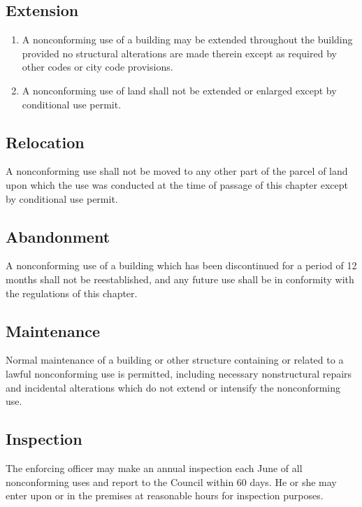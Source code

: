 \subsection{Extension}
\begin{enumerate}[{\indent}1)]
    \item A nonconforming use of a building may be extended throughout the building provided no structural alterations are made therein except as required by other codes or city code provisions.
    \item A nonconforming use of land shall not be extended or enlarged except by conditional use permit.
\end{enumerate}
\subsection{Relocation}
A nonconforming use shall not be moved to any other part of the parcel of land upon which the use was conducted at the time of passage of this chapter except by conditional use permit.
\subsection{Abandonment}
A nonconforming use of a building which has been discontinued for a period of 12 months shall not be reestablished, and any future use shall be in conformity with the regulations of this chapter.
\subsection{Maintenance}
Normal maintenance of a building or other structure containing or related to a lawful nonconforming use is permitted, including necessary nonstructural repairs and incidental alterations which do not extend or intensify the nonconforming use.
\subsection{Inspection}
The enforcing officer may make an annual inspection each June of all nonconforming uses and report to the Council within 60 days.  He or she may enter upon or in the premises at reasonable hours for inspection purposes.


\setcounter{section}{129}
